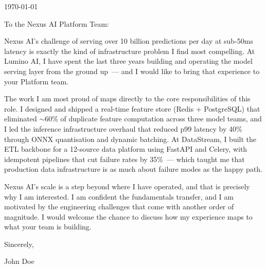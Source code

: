 \documentclass{ExpressiveCoverLetter}
\begin{document}
\coverletterheader[
    firstname=John,
    lastname=Doe,
    email=john.doe@example.com,
    phone=+49 163 555 1584,
    linkedin=johndoe,
    github=johndoe,
    city=Berlin,
    state=Germany
]

\vspace{0.25in}
\today
\vspace{0.15in}

To the Nexus AI Platform Team:

Nexus AI's challenge of serving over 10 billion predictions per day at
sub-50ms latency is exactly the kind of infrastructure problem I find most
compelling. At Lumino AI, I have spent the last three years building and
operating the model serving layer from the ground up~--- and I would like
to bring that experience to your Platform team.

The work I am most proud of maps directly to the core responsibilities of
this role. I designed and shipped a real-time feature store (Redis +
PostgreSQL) that eliminated $\sim$60\% of duplicate feature computation
across three model teams, and I led the inference infrastructure overhaul
that reduced p99 latency by 40\% through ONNX quantisation and dynamic
batching. At DataStream, I built the ETL backbone for a 12-source data
platform using FastAPI and Celery, with idempotent pipelines that cut
failure rates by 35\%~--- which taught me that production data
infrastructure is as much about failure modes as the happy path.

Nexus AI's scale is a step beyond where I have operated, and that is
precisely why I am interested. I am confident the fundamentals transfer,
and I am motivated by the engineering challenges that come with another
order of magnitude. I would welcome the chance to discuss how my
experience maps to what your team is building.

Sincerely,

\vspace{.15in}

John Doe
\end{document}
